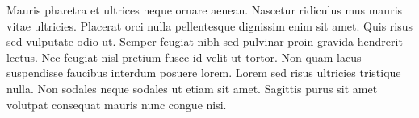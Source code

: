 Mauris pharetra et ultrices neque ornare aenean. Nascetur ridiculus mus mauris vitae ultricies. Placerat orci nulla pellentesque dignissim enim sit amet. Quis risus sed vulputate odio ut. Semper feugiat nibh sed pulvinar proin gravida hendrerit lectus. Nec feugiat nisl pretium fusce id velit ut tortor. Non quam lacus suspendisse faucibus interdum posuere lorem. Lorem sed risus ultricies tristique nulla. Non sodales neque sodales ut etiam sit amet. Sagittis purus sit amet volutpat consequat mauris nunc congue nisi.





